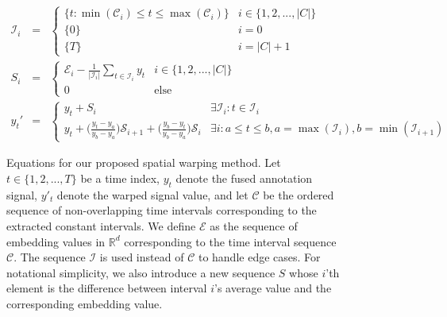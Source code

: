 \documentclass[10pt,letterpaper]{article}
\begin{document}
\begin{figure}[!t]
\begin{adjustwidth}{-2.25in}{0in}
\normalsize
\setcounter{equation}{0}
\begin{eqnarray}
\label{eqn:interval_sequence}
\mathcal{I}_i &=&
\begin{cases}
\{t : \min(\mathcal{C}_i) \leq t \leq \max(\mathcal{C}_i)\} & i \in \{1,2,...,|C|\} \\
\{0\} & i = 0 \\
\{T\} & i = |C|+1
\end{cases}\\
\label{eqn:interval_difference}
S_i &=&
\begin{cases}
\mathcal{E}_i - \frac{1}{|\mathcal{I}_i|}\sum\limits_{t\in\mathcal{I}_i} y_t & i \in \{1,2,...,|C|\} \\
0 & \text{else}
\end{cases}\\
\label{eqn:warp}
y_t' &=&
\begin{cases}
y_t + S_i & \exists \mathcal{I}_i : t \in \mathcal{I}_i \\
y_t + \Big(\frac{y_t-y_a}{y_b-y_a}\Big)\mathcal{S}_{i+1} + \Big(\frac{y_b-y_t}{y_b-y_a}\Big)\mathcal{S}_i & \exists i : a \leq t \leq b, a = \max(\mathcal{I}_i), b = \min(\mathcal{I}_{i+1})
\end{cases}
\end{eqnarray}
\hrulefill
\vspace*{4pt}
\caption{Equations for our proposed spatial warping method.  Let $t \in \{1,2,...,T\}$ be a time index, $y_t$ denote the fused annotation signal, $y'_t$ denote the warped signal value, and let $\mathcal{C}$ be the ordered sequence of non-overlapping time intervals corresponding to the extracted constant intervals.  We define $\mathcal{E}$ as the sequence of embedding values in $\mathbb{R}^d$ corresponding to the time interval sequence $\mathcal{C}$.  The sequence $\mathcal{I}$ is used instead of $\mathcal{C}$ to handle edge cases.  For notational simplicity, we also introduce a new sequence $S$ whose $i$'th element is the difference between interval $i$'s average value and the corresponding embedding value.}
\label{Fig:equations}
\end{adjustwidth}
\end{figure}
\end{document}
